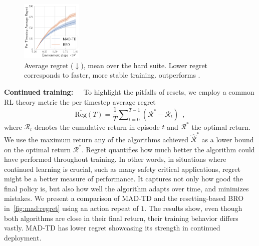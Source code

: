 \begin{figure}
    \centering
    \includegraphics[width=0.26\textwidth]{figures/mad-td/average_regret_all_envs.pdf}
    \caption{Average regret ($\downarrow$), mean over the hard suite. Lower regret corresponds to faster, more stable training.  outperforms .}
    \label{fig:mad:regret}    
    \vspace{1em}
\end{figure}
\textbf{Continued training:}~~~To highlight the pitfalls of resets, we employ a common RL theory metric the per timestep average regret
\begin{equation*}
    \overline{\text{Reg}}(T) = \frac{1}{T} \sum\nolimits_{t=0}^{T-1} \left(\mathcal{R}^* - \mathcal{R}_t\right) \enspace,
\end{equation*}
where $\mathcal{R}_t$ denotes the cumulative return in episode $t$ and $\mathcal{R}^*$ the optimal return. We use the maximum return any of the algorithms achieved $\hat{\mathcal{R}}^*$  as a lower bound on the optimal return $\mathcal{R}^*$. Regret quantifies how much better the algorithm could have performed throughout training. In other words, in situations where continued learning is crucial, such as many safety critical applications, regret might be a better measure of performance. It captures not only how good the final policy is, but also how well the algorithm adapts over time, and minimizes mistakes. We present a comparison of MAD-TD and the resetting-based BRO in~\autoref{fig:mad:regret} using an action repeat of $1$. The results show, even though both algorithms are close in their final return, their training behavior differs vastly. MAD-TD has lower regret showcasing its strength in continued deployment.

